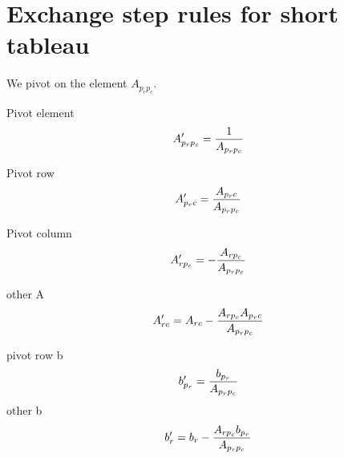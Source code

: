 \documentclass[12pt, a4]{article}
\begin{document}
\section{Exchange step rules for short tableau}
We pivot on the element $A_{p_rp_c}$.

Pivot element
\begin{equation}{\label{eq:pivot_element}}
	A'_{p_rp_c} = \frac{1}{A_{p_rp_c}}
\end{equation}

Pivot row
\begin{equation}{\label{eq:pivot_row}}
	A'_{p_rc} = \frac{A_{p_rc}}{A_{p_rp_c}}
\end{equation}

Pivot column
\begin{equation}{\label{eq:pivot_column}}
	A'_{rp_c} = -\frac{A_{rp_c}}{A_{p_rp_c}}
\end{equation}

other A
\begin{equation}{\label{eq:other_a}}
	A'_{rc} = A_{rc} - \frac{A_{rp_c}A_{p_rc}}{A_{p_rp_c}}
\end{equation}

pivot row b
\begin{equation}{\label{eq:pivot_b}}
	b'_{p_r} = \frac{b_{p_r}}{A_{p_rp_c}}
\end{equation}
other  b
\begin{equation}{\label{eq:other_b}}
	b'_{r} = b_r - \frac{A_{rp_c} b_{p_r}}{A_{p_rp_c}}
\end{equation}
\end{document}
